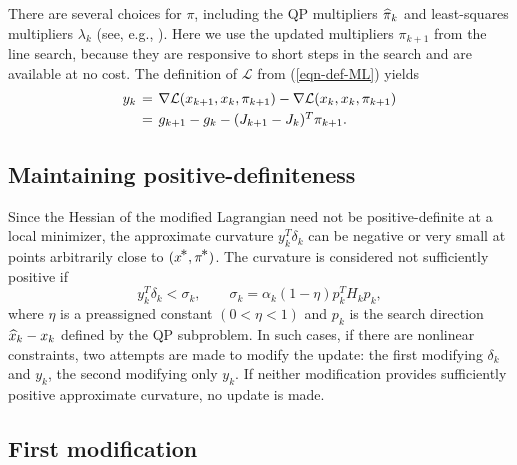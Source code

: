 \documentclass[draft,leqno,onefignum,onetabnum]{siamltex}
\def\grad{\nabla}
\def\kp#1{_{k+#1}}
\def\nthinsp{\mskip -2   mu}
\def\Lscr{{\mathcal L}}
\def\pihat{\skew1\widehat \pi}
\def\pistar{\pi\superstar}
\def\superstar{^{\raise 0.5pt\hbox{$\nthinsp *$}}}
\def\T{^T\!}
\def\xhat{\skew{2.8}\widehat x}
\def\xstar{x\superstar}
\def\gk{g_k}
\def\Jk{J_k}
\def\gkp{g_{k+1}}
\def\Jkp{J_{k+1}}
\def\L {\Lscr}                    %
\begin{document}
There are several choices for $\pi$, including the QP multipliers
$\pihat_k$ and least-squares multipliers $\lambda_k$ (see, e.g.,
\cite{GilM79b}).  Here we use the updated multipliers $\pi\kp1$
from the line search, because they are responsive to short steps in
the search and are available at no cost.  The definition of $\L$ from
(\ref{eqn-def-ML}) yields
$$
   \begin{array}{r@{\hspace{4pt}}c@{\hspace{4pt}}l}
      y_k &=& \grad\L(x\kp1,x_k,\pi\kp1) - \grad\L(x_k,x_k,\pi\kp1) \\[3pt]
          &=& \gkp - \gk - (\Jkp - \Jk)^T \pi\kp1.
   \end{array}
$$

 \subsection{Maintaining positive-definiteness} \label{sec-pd-H}

Since the Hessian of the modified Lagrangian need not be positive-definite
at a local minimizer, the approximate curvature $y_k\T\delta_k$ can be
negative or very small at points arbitrarily close to $(\xstar,\pistar)$.
The curvature is considered not sufficiently positive if
\begin{equation}                                 \label{eqn-min-curv}
   y_k\T\delta_k < \sigma_k,
   \qquad \sigma_k = \alpha_k(1 - \eta) p_k\T H_k p_k,
\end{equation}
where $\eta$ is a preassigned constant $(0 < \eta < 1)$ and $p_k$ is
the search direction $\xhat_k - x_k$ defined by the QP subproblem.  In
such cases, if there are nonlinear constraints, two
attempts are made to modify the update: the first modifying $\delta_k$
and $y_k$, the second modifying only $y_k$.  If neither modification
provides sufficiently positive approximate curvature, no update is
made.

\subsection*{First modification}
\end{document}

